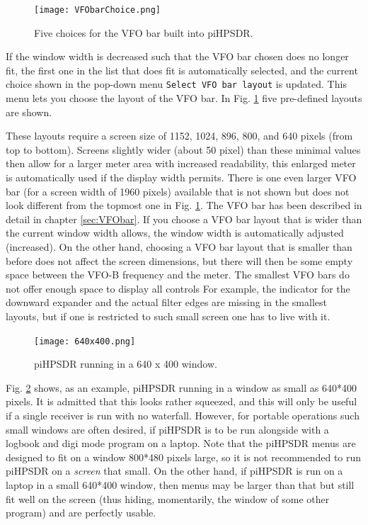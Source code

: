 \documentclass[12pt]{book}
\def\rett#1{\texttt{\color{red}#1}}
\def\pH{pi\-HPSDR\xspace}
\begin{document}
\begin{figure}[ht!]
\center
\texttt{[image: VFObarChoice.png]}
\caption{Five choices for the VFO bar built into \pH.}
\label{fig:VFObarChoice}
\end{figure}

If the window width is decreased such that the VFO bar chosen does no longer fit,
the first one in the list that does fit is automatically selected, and the
current choice shown in the
pop-down menu \rett{Select VFO bar layout} is updated. This menu lets you choose
the layout of the VFO
bar. In Fig. \ref{fig:VFObarChoice} five pre-defined layouts are shown.



These layouts require a screen size of 1152, 1024, 896, 800, and 640 pixels (from top to
bottom). Screens slightly wider (about 50 pixel) than these minimal values then allow for a larger meter
area with increased readability, this enlarged meter is automatically used if the display
width permits. There is one even larger VFO bar (for a screen width of 1960 pixels) available
that is not shown but does not look different from the topmost one in Fig. \ref{fig:VFObarChoice}.
The VFO bar has been described in detail in chapter
\ref{sec:VFObar}. If you choose a VFO bar layout that is wider than the current
window width allows, the window width is automatically adjusted (increased). On the
other hand, choosing a VFO bar layout that is smaller than before does not affect
the screen dimensions, but there will then be some empty space between the VFO-B
frequency and the meter. The smallest VFO bars do not offer enough space to display all controls
For example, the indicator for the downward expander and the actual filter edges are  missing
in  the smallest layouts, but if one is restricted to such small screen one has to live with it.

\begin{figure}[ht!]
\center
\texttt{[image: 640x400.png]}
\caption{\pH running in a 640 x 400 window.}
\label{fig:640x400}
\end{figure}

Fig. \ref{fig:640x400} shows, as an example, \pH running in a window as small
as 640*400 pixels. It is admitted that this looks rather squeezed, and this
will only be useful if a single receiver is run with no waterfall. However, for
portable operations such small windows are often desired,
if \pH is to be run alongside with a logbook and digi mode program on a  laptop.
Note that the \pH menus are designed to fit on a window 800*480 pixels large, so
it is not recommended to run \pH on a \textit{screen} that small. On the other hand,
if \pH is run on a laptop in a small 640*400 window, then menus may be larger than
that but still fit well on the screen (thus hiding, momentarily, the window of some
other program) and are perfectly usable.
\end{document}
